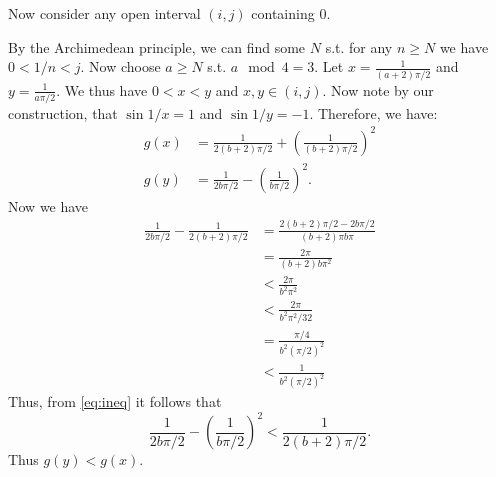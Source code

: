 \documentclass[10pt]{article}
\begin{document}
Now consider any open interval $(i,j)$ containing $0.$

By the Archimedean principle, we can find some $N$ s.t. for any $n\ge N$ we have $0<1/n<j.$ Now choose $a \ge N$ s.t. $a \mod 4 = 3.$ Let  $x=\frac{1}{(a+2)\pi/2}$ and $y = \frac{1}{a\pi/2}.$ We thus have $0<x<y$ and $x,y\in (i,j).$ Now note by our construction, that $\sin 1/x = 1$ and $\sin 1/y = -1.$ Therefore, we have:
\begin{align*}
    g(x) &=\frac{1}{2(b+2)\pi/2} + \left ( \frac{1}{(b+2)\pi/2} \right )^2\\
    g(y) &=\frac{1}{2b\pi/2} - \left ( \frac{1}{b\pi/2} \right )^2.
\end{align*}
Now we have
\begin{align}
    \frac{1}{2b\pi/2}-\frac{1}{2(b+2)\pi/2} &= \frac{2(b+2)\pi/2-2b\pi/2}{(b+2)\pi b\pi}\nonumber\\
    &= \frac{2\pi}{(b+2)b\pi^2}\nonumber\\
    &< \frac{2\pi}{b^2\pi^2}\nonumber\\
    &< \frac{2\pi}{b^2\pi^2/32}\nonumber\\
    &= \frac{\pi/4}{b^2(\pi/2)^2}\nonumber\\
    &<\frac{1}{b^2(\pi/2)^2} \label{eq:ineq}
\end{align}
Thus, from \eqref{eq:ineq} %
it follows that 
\begin{equation*}
    \frac{1}{2b\pi/2} - \left ( \frac{1}{b\pi/2} \right )^2 < \frac{1}{2(b+2)\pi/2}.
\end{equation*}
Thus $g(y)<g(x).$
\end{document}
